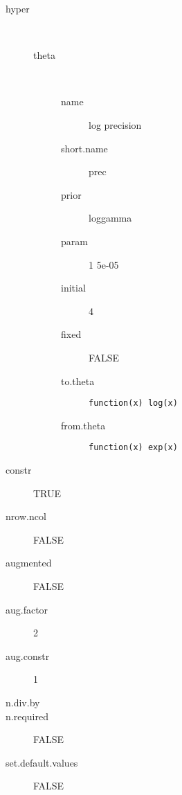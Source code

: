 \begin{description}
	\item[hyper]\ 
	 \begin{description}
	 	\item[theta]\ 
	 	 \begin{description}
	 	 	 \item[ name ] log precision 
	 	 	 \item[ short.name ] prec 
	 	 	 \item[ prior ] loggamma 
	 	 	 \item[ param ] 1 5e-05 
	 	 	 \item[ initial ] 4 
	 	 	 \item[ fixed ] FALSE 
	 	 	 \item[ to.theta ] \verb|function(x) log(x)| 
	 	 	 \item[ from.theta ] \verb|function(x) exp(x)| 
	 	 \end{description}
	 \end{description}
	 \item[ constr ] TRUE 
	 \item[ nrow.ncol ] FALSE 
	 \item[ augmented ] FALSE 
	 \item[ aug.factor ] 2 
	 \item[ aug.constr ] 1 
	 \item[ n.div.by ]  
	 \item[ n.required ] FALSE 
	 \item[ set.default.values ] FALSE 
\end{description}
